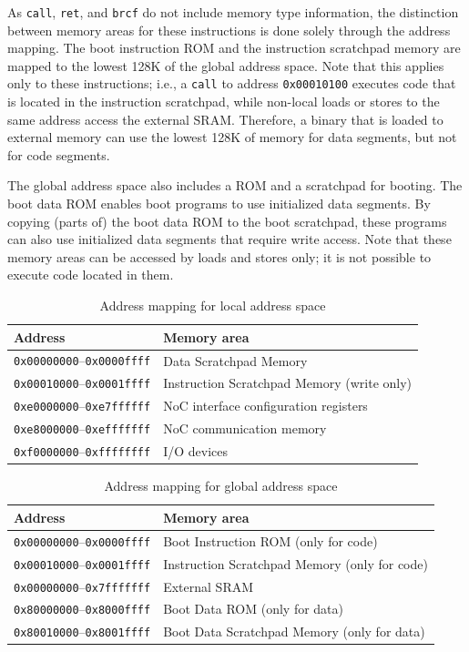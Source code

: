 \documentclass[a4paper,fontsize=10pt,twoside,DIV15,BCOR12mm,headinclude=true,footinclude=false,pagesize,bibtotoc]{scrbook}
\newcommand{\code}[1]{{\texttt{#1}}}
\begin{document}
As \code{call}, \code{ret}, and \code{brcf} do not include memory type
information, the distinction between memory areas for these
instructions is done solely through the address mapping. The boot instruction ROM
and the instruction scratchpad memory are mapped to the lowest 128K of
the global address space. Note that this applies only to these
instructions; i.e., a \code{call} to address \code{0x00010100}
executes code that is located in the instruction scratchpad, while
non-local loads or stores to the same address access the external
SRAM. Therefore, a binary that is loaded to external memory can use
the lowest 128K of memory for data segments, but not for code
segments.

The global address space also includes a ROM and a scratchpad for
booting. The boot data ROM enables boot programs to use initialized
data segments. By copying (parts of) the boot data ROM to the boot
scratchpad, these programs can also use initialized data segments that
require write access. Note that these memory areas can be accessed by
loads and stores only; it is not possible to execute code located in
them.

\begin{table}
\centering
\begin{tabular}{ll}
\toprule
Address & Memory area \\
\midrule
\code{0x00000000}--\code{0x0000ffff} & Data Scratchpad Memory \\
\code{0x00010000}--\code{0x0001ffff} & Instruction Scratchpad Memory (write only) \\
\code{0xe0000000}--\code{0xe7ffffff} & NoC interface configuration registers \\
\code{0xe8000000}--\code{0xefffffff} & NoC communication memory \\
\code{0xf0000000}--\code{0xffffffff} & I/O devices \\
\bottomrule
\end{tabular}
\caption{Address mapping for local address space}
\label{tab:lmmap}
\end{table}

\begin{table}
\centering
\begin{tabular}{ll}
\toprule
Address & Memory area \\
\midrule
\code{0x00000000}--\code{0x0000ffff} & Boot Instruction ROM (only for code) \\
\code{0x00010000}--\code{0x0001ffff} & Instruction Scratchpad Memory (only for code) \\
\code{0x00000000}--\code{0x7fffffff} & External SRAM \\
\code{0x80000000}--\code{0x8000ffff} & Boot Data ROM (only for data) \\
\code{0x80010000}--\code{0x8001ffff} & Boot Data Scratchpad Memory (only for data) \\
\bottomrule
\end{tabular}
\caption{Address mapping for global address space}
\label{tab:gmmap}
\end{table}
\end{document}
